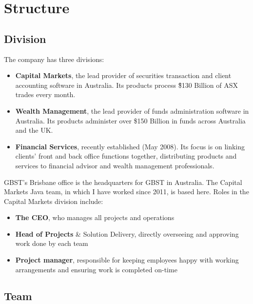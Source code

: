 \newpage

\section{Structure}

\subsection{Division}

The company has three divisions:

\begin{itemize}
\item \textbf{Capital Markets}, the lead provider of securities transaction and client accounting software in Australia. Its products process \~\$130 Billion of ASX trades every month.
\item \textbf{Wealth Management}, the lead provider of funds administration software in Australia. Its products administer over \$150 Billion in funds across Australia and the UK.
\item \textbf{Financial Services}, recently established (May 2008). Its focus is on linking clients' front and back office functions together, distributing products and services to financial advisor and wealth management professionals.
\end{itemize}

GBST's Brisbane office is the headquarters for GBST in Australia. The Capital Markets Java team, in which I have worked since 2011, is based here. Roles in the Capital Markets division include:
\begin{itemize}
\item \textbf{The CEO}, who manages all projects and operations
\item \textbf{Head of Projects} \& Solution Delivery, directly overseeing and approving work done by each team
\item \textbf{Project manager}, responsible for keeping employees happy with working arrangements and ensuring work is completed on-time
\end{itemize}

\subsection{Team}

